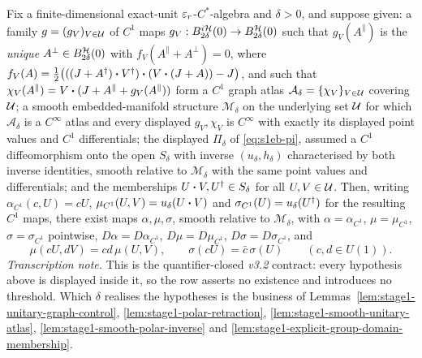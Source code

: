 \begin{lemma}\label{lem:stage1-explicit-smooth-unitary-operations}
Fix a finite-dimensional exact-unit $\varepsilon_r$-$C^*$-algebra and $\delta>0$, and suppose given:
a family $g=(g_V)_{V\in\mathcal U}$ of $C^{1}$ maps
$g_V:B^{i\mathcal H}_{2\delta}(0)\to B^{\mathcal H}_{2\delta}(0)$ such that $g_V(A^{\parallel})$ is the
\emph{unique} $A^{\perp}\in B^{\mathcal H}_{2\delta}(0)$ with $f_V(A^{\parallel}+A^{\perp})=0$,
where $f_V(A)=\tfrac12\bigl(((J+A^{\dagger})\mathbin{\bm{\cdot}} V^{\dagger})\mathbin{\bm{\cdot}}(V\mathbin{\bm{\cdot}}(J+A))-J\bigr)$, and such that
$\chi_V(A^{\parallel})=V\mathbin{\bm{\cdot}}(J+A^{\parallel}+g_V(A^{\parallel}))$ form a $C^{1}$ graph atlas
$\mathcal A_\delta=\{\chi_V\}_{V\in\mathcal U}$ covering $\mathcal U$; a smooth embedded-manifold
structure $\mathcal M_\delta$ on the underlying set $\mathcal U$ for which $\mathcal A_\delta$ is
a $C^{\infty}$ atlas and every displayed $g_V,\chi_V$ is $C^{\infty}$ with exactly its
displayed point values and $C^{1}$ differentials; the displayed $\Pi_\delta$ of
\eqref{eq:s1eb-pi}, assumed a $C^{1}$ diffeomorphism onto the open $S_\delta$ with inverse
$(u_\delta,h_\delta)$ characterised by both inverse identities, smooth relative to
$\mathcal M_\delta$ with the same point values and differentials; and the memberships
$U\mathbin{\bm{\cdot}} V,U^{\dagger}\in S_\delta$ for all $U,V\in\mathcal U$. Then, writing
$\alpha_{C^{1}}(c,U)=cU$, $\mu_{C^{1}}(U,V)=u_\delta(U\mathbin{\bm{\cdot}} V)$ and
$\sigma_{C^{1}}(U)=u_\delta(U^{\dagger})$ for the resulting $C^{1}$ maps, there exist maps
$\alpha,\mu,\sigma$, smooth relative to $\mathcal M_\delta$, with
$\alpha=\alpha_{C^{1}}$, $\mu=\mu_{C^{1}}$, $\sigma=\sigma_{C^{1}}$ pointwise,
$D\alpha=D\alpha_{C^{1}}$, $D\mu=D\mu_{C^{1}}$, $D\sigma=D\sigma_{C^{1}}$, and
\begin{equation}\label{eq:s1eb-covariance}
  \mu(cU,dV)=cd\,\mu(U,V),\qquad \sigma(cU)=\bar c\,\sigma(U)
  \qquad(c,d\in U(1)).
\end{equation}
\emph{Transcription note.} This is the quantifier-closed \emph{v3.2} contract: every
hypothesis above is displayed inside it, so the row asserts no existence and introduces no
threshold. Which $\delta$ realises the hypotheses is the business of
Lemmas~\ref{lem:stage1-unitary-graph-control}, \ref{lem:stage1-polar-retraction},
\ref{lem:stage1-smooth-unitary-atlas}, \ref{lem:stage1-smooth-polar-inverse} and
\ref{lem:stage1-explicit-group-domain-membership}.
\end{lemma}

